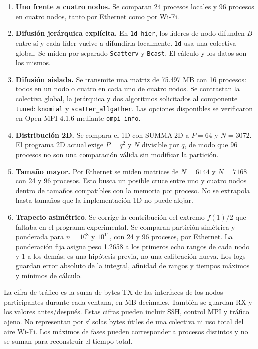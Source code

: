 \documentclass[11pt,a4paper]{article}
\begin{document}
\begin{enumerate}
\item \textbf{Uno frente a cuatro nodos.} Se comparan 24 procesos locales y 96 procesos en cuatro nodos, tanto por Ethernet como por Wi-Fi.
\item \textbf{Difusión jerárquica explícita.} En \texttt{1d-hier}, los líderes de nodo difunden $B$ entre sí y cada líder vuelve a difundirla localmente. \texttt{1d} usa una colectiva global. Se miden por separado \texttt{Scatterv} y \texttt{Bcast}. El cálculo y los datos son los mismos.
\item \textbf{Difusión aislada.} Se transmite una matriz de 75.497 MB con 16 procesos: todos en un nodo o cuatro en cada uno de cuatro nodos. Se contrastan la colectiva global, la jerárquica y dos algoritmos solicitados al componente \texttt{tuned}: \texttt{knomial} y \texttt{scatter\_allgather}. Las opciones disponibles se verificaron en Open MPI 4.1.6 mediante \texttt{ompi\_info}.
\item \textbf{Distribución 2D.} Se compara el 1D con SUMMA 2D a $P=64$ y $N=3072$. El programa 2D actual exige $P=q^2$ y $N$ divisible por $q$, de modo que 96 procesos no son una comparación válida sin modificar la partición.
\item \textbf{Tamaño mayor.} Por Ethernet se miden matrices de $N=6144$ y $N=7168$ con 24 y 96 procesos. Esto busca un posible cruce entre uno y cuatro nodos dentro de tamaños compatibles con la memoria por proceso. No se extrapola hasta tamaños que la implementación 1D no puede alojar.
\item \textbf{Trapecio asimétrico.} Se corrige la contribución del extremo $f(1)/2$ que faltaba en el programa experimental. Se comparan partición simétrica y ponderada para $n=10^8$ y $10^{11}$, con 24 y 96 procesos, por Ethernet. La ponderación fija asigna peso 1.2658 a los primeros ocho rangos de cada nodo y 1 a los demás; es una hipótesis previa, no una calibración nueva. Los logs guardan error absoluto de la integral, afinidad de rangos y tiempos máximos y mínimos de cálculo.
\end{enumerate}

La cifra de tráfico es la suma de bytes TX de las interfaces de los nodos participantes durante cada ventana, en MB decimales. También se guardan RX y los valores antes/después. Estas cifras pueden incluir SSH, control MPI y tráfico ajeno. No representan por sí solas bytes útiles de una colectiva ni uso total del aire Wi-Fi. Los máximos de fases pueden corresponder a procesos distintos y no se suman para reconstruir el tiempo total.
\end{document}
